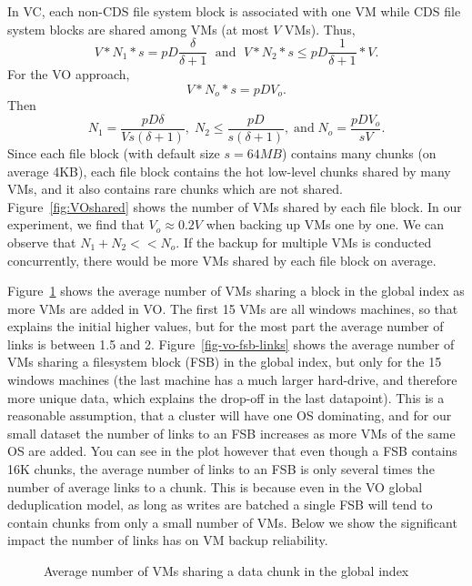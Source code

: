 In VC, each non-CDS file system block is associated with one VM while CDS file system blocks are
shared among VMs  (at most $V$ VMs). Thus, 
\[
V *N_1 *s  = pD  \frac{\delta} {\delta +1} \; \mbox{ and } \; 
V *N_2 *s  \leq pD  \frac{1} {\delta +1} *V.
\]
For the VO approach, 
\[
V *N_o *s  = pD  V_o.
\]
Then
\[
N_1= \frac{pD \delta} {V s (\delta +1)},\; 
N_2 \leq \frac{pD } {s (\delta +1)}, \; 
\mbox{and} \; N_o = \frac{pD V_o } {s V}.
\]
Since each file block (with default size $s=64MB$) contains many chunks (on average 4KB),
each file block contains the hot low-level chunks shared by many VMs, and it also contains
rare chunks which are not shared.
Figure~\ref{fig:VOshared} shows the number of VMs shared by each file block.
In our experiment, we find that $V_o \approx 0.2 V$ when backing up VMs one by one.
We can observe that $N_1 +N_2 << N_o$.
If  the backup for multiple VMs is conducted concurrently, there would be more
VMs shared  by each file block on average.

Figure~\ref{fig-vo-links} shows the average number of VMs sharing a block in
the global index as more VMs are added in VO.  The first 15 VMs are all windows
machines, so that explains the initial higher values, but for the most part the
average number of links is between 1.5 and 2. Figure~\ref{fig-vo-fsb-links}
shows the average number of VMs sharing a filesystem block (FSB) in the global
index, but only for the 15 windows machines (the last machine has a much larger
hard-drive, and therefore more unique data, which explains the drop-off in the
last datapoint).  This is a reasonable assumption, that a cluster will have one
OS dominating, and for our small dataset the number of links to an FSB
increases as more VMs of the same OS are added. You can see in the plot however
that even though a FSB contains 16K chunks, the average number of links to an
FSB is only several times the number of average links to a chunk. This is
because even in the VO global deduplication model, as long as writes are
batched a single FSB will tend to contain chunks from only a small number of
VMs. Below we show the significant impact the number of links has on VM backup
reliability.

\begin{figure}[ht]
  \centering
  \caption{Average number of VMs sharing a data chunk in the global index}
  \label{fig-vo-links}
\end{figure}

